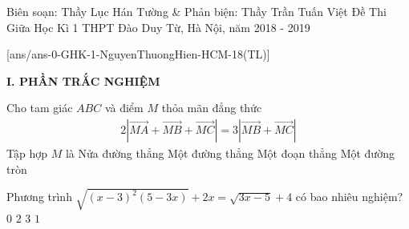 \begin{name}
	{Biên soạn: Thầy Lục Hán Tường \& Phản biện: Thầy Trần Tuấn Việt}
	{Đề Thi Giữa Học Kì 1 THPT Đào Duy Từ, Hà Nội, năm 2018 - 2019}
\end{name}

\setcounter{ex}{0}\setcounter{bt}{0}
[ans/ans-0-GHK-1-NguyenThuongHien-HCM-18(TL)]

\noindent\textbf{I. PHẦN TRẮC NGHIỆM}

\begin{ex}%
	Cho tam giác $ ABC $  và điểm $ M $ thỏa mãn đẳng thức
	\begin{align*}
		2 \left|\vec{MA} + \vec{MB} + \vec{MC}\right| = 3\left|\vec{MB} + \vec{MC}\right|
	\end{align*}
	Tập hợp $ M $ là
	\choice
	{Nửa đường thẳng}
	{\True Một đường thẳng}
	{Một đoạn thẳng}
	{Một đường tròn}
\end{ex}

\begin{ex}%
	Phương trình $ \sqrt{\left(x - 3\right)^2\left(5 - 3x\right)} + 2x = \sqrt{3x - 5} + 4 $ có bao nhiêu nghiệm?
	\choice
	{\True $ 0 $}
	{$ 2 $}
	{$ 3 $}
	{$ 1 $}
\end{ex}


